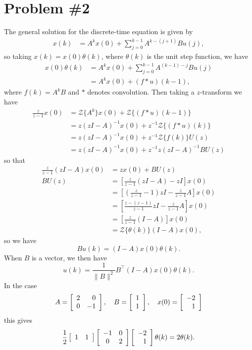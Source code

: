 \documentclass{article}
\begin{document}
\section*{Problem \#2}
The general solution for the discrete-time equation is given by
\begin{align*}
x(k) &= A^k x(0) + \sum_{j=0}^{k-1} A^{k - (j+1)}Bu(j),
\end{align*}
so taking $x(k) = x(0) \theta(k)$, where $\theta(k)$ is the unit step
function, we have
\begin{align*}
x(0) \theta(k) &= A^k x(0)
      + \sum_{j=0}^{k-1} A^{(k-1) - j} B u(j) \\
     &= A^k x(0)
      + (f \ast u)(k-1),
\end{align*}
where $f(k) = A^k B$ and $\ast$ denotes convolution. Then taking a
$z$-transform we have
\begin{align*}
\frac{z}{z-1}x(0) &=
  \mathcal{Z}\{A^k\}x(0)
+ \mathcal{Z}\{(f \ast u)(k - 1)\} \\
&= z(zI - A)^{-1} x(0)
 + z^{-1}\mathcal{Z}\{(f \ast u)(k)\} \\
&= z(zI - A)^{-1} x(0)
 + z^{-1}\mathcal{Z}\{f(k)\} U(z) \\
&= z(zI - A)^{-1} x(0)
 + z^{-1}z(zI - A)^{-1} B U(z)
\end{align*}
so that
\begin{align*}
\frac{z}{z-1}(zI - A)x(0) &=
  zx(0) + BU(z) \\
B U(z) 
&= \left[\frac{z}{z-1}(zI - A) - zI\right]x(0) \\
&= \left[\left(\frac{z}{z-1} - 1\right)zI 
       - \frac{z}{z-1}A\right] x(0)\\
&= \left[\frac{z - (z-1)}{z-1}zI 
       - \frac{z}{z-1} A\right] x(0) \\
&= \left[\frac{z}{z-1}(I - A)\right]x(0) \\
&= \mathcal{Z}\{\theta(k)\} (I - A) x(0),
\end{align*}
so we have
$$
B u(k) = (I - A) x(0) \theta(k).
$$
When $B$ is a vector, we then have
$$
u(k) = \frac{1}{\| B \|^2} B^\top (I - A) x(0) \theta(k).
$$
In the case
$$
A = \left[\begin{array}{r r}
      2 & 0 \\ 0 & -1
    \end{array}\right], \quad
B = \left[\begin{array}{c}
      1 \\ 1
    \end{array}\right], \quad
x(0) = \left[\begin{array}{r}
        -2 \\ 1
       \end{array}\right]
$$
this gives
$$
\frac{1}{2} 
\left[\begin{array}{c c} 
  1 & 1
\end{array}\right]
\left[\begin{array}{c c}
  -1 & 0 \\ 0 & 2
\end{array}\right]
\left[\begin{array}{r}
  -2 \\ 1
\end{array}\right] \theta(k)
= 2 \theta(k).
$$
\end{document}
